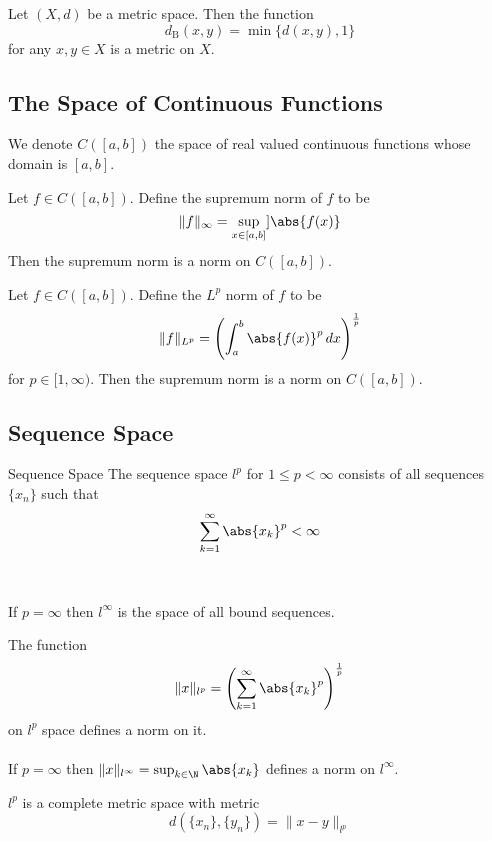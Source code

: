 \begin{prp}{}{} Let $(X,d)$ be a metric space. Then the function $$d_\text{B}(x,y)=\min\{d(x,y),1\}$$ for any $x,y\in X$ is a metric on $X$. 
\end{prp}

\subsection{The Space of Continuous Functions}
\begin{defn}{}{} We denote $C([a,b])$ the space of real valued continuous functions whose domain is $[a,b]$. 
\end{defn}

\begin{prp}{}{} Let $f\in C([a,b])$. Define the supremum norm of $f$ to be $$\|f\|_\infty=\sup_{x\in[a,b]}]\abs{f(x)}$$ Then the supremum norm is a norm on $C([a,b])$. 
\end{prp}

\begin{prp}{}{} Let $f\in C([a,b])$. Define the $L^p$ norm of $f$ to be $$\|f\|_{L^p}=\left(\int_a^b\abs{f(x)}^p\,dx\right)^{\frac{1}{p}}$$ for $p\in[1,\infty)$. Then the supremum norm is a norm on $C([a,b])$. 
\end{prp}

\subsection{Sequence Space}
\begin{defn}{Sequence Space}{} The sequence space $l^p$ for $1\leq p<\infty$ consists of all sequences $\{x_n\}$ such that $$\sum_{k=1}^\infty\abs{x_k}^p<\infty$$ \\~\\
If $p=\infty$ then $l^\infty$ is the space of all bound sequences. 
\end{defn}

\begin{prp}{}{} The function $$\|x\|_{l^p}=\left(\sum_{k=1}^\infty\abs{x_k}^p\right)^{\frac{1}{p}}$$ on $l^p$ space defines a norm on it. \\~\\ If $p=\infty$ then $\|x\|_{l^\infty}=\sup_{k\in\N}\abs{x_k}$ defines a norm on $l^\infty$. 
\end{prp}

\begin{prp}{}{} $l^p$ is a complete metric space with metric $$d(\{x_n\},\{y_n\})=\|x-y\|_{l^p}$$
\end{prp}